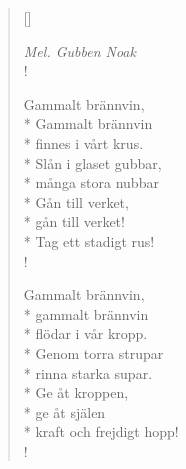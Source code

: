 
\settowidth{\versewidth}{Slån i glaset gubbar,}



\begin{verse}[\versewidth]

\flagverse{}
\emph{Mel. Gubben Noak}\\!

Gammalt brännvin,\\*
Gammalt brännvin\\*
finnes i vårt krus.\\*
Slån i glaset gubbar,\\*
många stora nubbar\\*
Gån till verket,\\*
gån till verket!\\*
Tag ett stadigt rus!\\!


Gammalt brännvin,\\*
gammalt brännvin\\*
flödar i vår kropp.\\*
Genom torra strupar\\*
rinna starka supar.\\*
Ge åt kroppen,\\*
ge åt själen\\*
kraft och frejdigt hopp!\\!


\end{verse}


